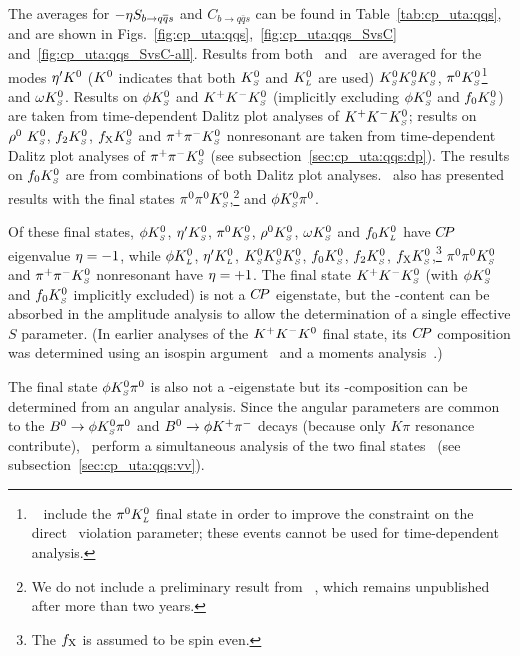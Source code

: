 The averages for $-\etacp S_{b \to q\bar q s}$ and $C_{b \to q\bar q s}$
can be found in Table~\ref{tab:cp_uta:qqs},
and are shown in Figs.~\ref{fig:cp_uta:qqs},~\ref{fig:cp_uta:qqs_SvsC} 
and~\ref{fig:cp_uta:qqs_SvsC-all}.
Results from both \babar\  and \belle\ are averaged for the modes
${\eta^{\prime}}K^0$ ($K^0$ indicates that both $K^0_{\scriptscriptstyle S}$ and $K^0_{\scriptscriptstyle L}$ are used)
$K^0_{\scriptscriptstyle S}K^0_{\scriptscriptstyle S}K^0_{\scriptscriptstyle S}$, $\pi^0 K^0_{\scriptscriptstyle S}$\footnote{
  \belle~\cite{Fujikawa:2008pk} include the $\pi^0K^0_{\scriptscriptstyle L}$ final state in order to
  improve the constraint on the direct \CP\ violation parameter; these events
  cannot be used for time-dependent analysis.
} and $\omega K^0_{\scriptscriptstyle S}$.
Results on $\phi K^0_{\scriptscriptstyle S}$ and $K^+K^-K^0_{\scriptscriptstyle S}$ (implicitly excluding $\phi K^0_{\scriptscriptstyle S}$ and $f_0K^0_{\scriptscriptstyle S}$) are taken from time-dependent Dalitz plot analyses of $K^+K^-K^0_{\scriptscriptstyle S}$;
results on $\rho^0\hbox{ }K^0_{\scriptscriptstyle S}$, $f_2K^0_{\scriptscriptstyle S}$, $f_{\rm X}K^0_{\scriptscriptstyle S}$ and $\pi^+\pi^-K^0_{\scriptscriptstyle S}$ nonresonant are taken from time-dependent Dalitz plot analyses of $\pi^+\pi^-K^0_{\scriptscriptstyle S}$ (see
subsection~\ref{sec:cp_uta:qqs:dp}).
The results on $f_0K^0_{\scriptscriptstyle S}$ are from combinations of both Dalitz plot analyses.
\babar\ also has presented results with the final states
$\pi^0\pi^0K^0_{\scriptscriptstyle S}$,\footnote{
  We do not include a preliminary result from \belle~\cite{:2007xd}, which
  remains unpublished after more than two years.
}
and $\phi K^0_{\scriptscriptstyle S} \pi^0$. 

Of these final states,
$\phi K^0_{\scriptscriptstyle S}$, ${\eta^{\prime}}K^0_{\scriptscriptstyle S}$, $\pi^0 K^0_{\scriptscriptstyle S}$, $\rho^0K^0_{\scriptscriptstyle S}$, $\omega K^0_{\scriptscriptstyle S}$ and $f_0K^0_{\scriptscriptstyle L}$
have $C\!P$ eigenvalue ${\eta} = -1$, 
while $\phi K^0_{\scriptscriptstyle L}$, ${\eta^{\prime}}K^0_{\scriptscriptstyle L}$, $K^0_{\scriptscriptstyle S}K^0_{\scriptscriptstyle S}K^0_{\scriptscriptstyle S}$, $f_0 K^0_{\scriptscriptstyle S}$, $f_2 K^0_{\scriptscriptstyle S}$, 
$f_{\rm X} K^0_{\scriptscriptstyle S}$,\footnote{ 
  The $f_{\rm X}$ is assumed to be spin even.
} $\pi^0\pi^0K^0_{\scriptscriptstyle S}$ and $\pi^+ \pi^- K^0_{\scriptscriptstyle S}$ nonresonant have ${\eta} = +1$.
The final state $K^+K^-K^0_{\scriptscriptstyle S}$ (with $\phi K^0_{\scriptscriptstyle S}$ and $f_0K^0_{\scriptscriptstyle S}$ implicitly excluded)
is not a $C\!P$ eigenstate, but the \CP-content can be absorbed in the amplitude analysis to allow the determination of a single effective $S$ parameter.
(In earlier analyses of the $K^+K^-K^0$ final state,
its $C\!P$ composition was determined using an isospin argument~\cite{Abe:2006gy}
and a moments analysis~\cite{Aubert:2005ja}.)



The final state $\phi K^0_{\scriptscriptstyle S} \pi^0$ is also not a \CP-eigenstate but its
\CP-composition can be determined from an angular analysis.
Since the angular parameters are common to the $B^0\to\phi K^0_{\scriptscriptstyle S} \pi^0$ and
$B^0\to \phi K^+\pi^-$ decays (because only $K\pi$ resonance contribute),
\babar\ perform a simultaneous analysis of the two final
states~\cite{Aubert:2008zza} (see subsection~\ref{sec:cp_uta:qqs:vv}).

